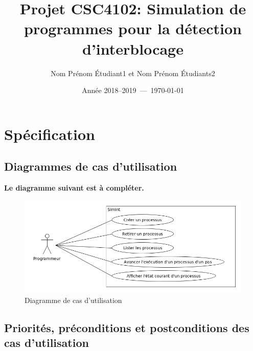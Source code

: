 \documentclass[11pt,article]{article}
\begin{document}
\title{Projet CSC4102: Simulation de programmes pour la détection d'interblocage}
\author{Nom Prénom Étudiant1 et Nom Prénom Étudiants2}
\date{Année 2018--2019~---~\today}
\maketitle

\newpage

\tableofcontents

\newpage

\section{Spécification}

\subsection{Diagrammes de cas d'utilisation}

{\color{red}\textbf{Le diagramme suivant est à compléter.}}

\begin{figure}[h!]
\begin{center}
\includegraphics[scale=0.5]{DiagrammesDeCasDUtilisation/simint_uml_diag_cas_utilisation_processus}
\caption{Diagramme de cas d'utilisation}
\end{center}
\label{usecase_umlet_simint}
\end{figure}

\newpage

\subsection{Priorités, préconditions et postconditions des cas d'utilisation}
\end{document}
